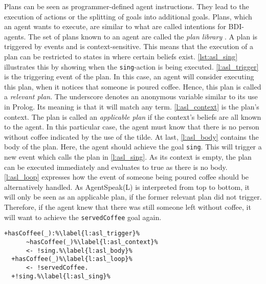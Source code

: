 Plans can be seen as programmer-defined agent instructions. They lead to the execution of actions or the splitting of goals into additional goals. Plans, which an agent wants to execute, are similar to what are called intentions for BDI-agents. The set of plans known to an agent are called the \emph{plan library} \cite{bordini_jason_2005}. A plan is triggered by events and is context-sensitive. This means that the execution of a plan can be restricted to states in where certain beliefs exist. \autoref{lst:asl_sing} illustrates this by showing when the \texttt{sing}-action is being executed. \autoref{l:asl_trigger} is the triggering event of the plan. In this case, an agent will consider executing this plan, when it notices that someone is poured coffee. Hence, this plan is called a \emph{relevant plan}. The underscore denotes an anonymous variable similar to its use in Prolog. Its meaning is that it will match any term. \autoref{l:asl_context} is the plan's context. The plan is called an \emph{applicable plan} if the context's beliefs are all known to the agent. In this particular case, the agent must know that there is no person without coffee indicated by the use of the tilde. At last, \autoref{l:asl_body} contains the body of the plan. Here, the agent should achieve the goal \texttt{sing}. This will trigger a new event which calls the plan in \autoref{l:asl_sing}. As its context is empty, the plan can be executed immediately and evaluates to true as there is no body. \autoref{l:asl_loop} expresses how the event of someone being poured coffee should be alternatively handled. As AgentSpeak(L) is interpreted from top to bottom, it will only be seen as an applicable plan, if the former relevant plan did not trigger. Therefore, if the agent knew that there was still someone left without coffee, it will want to achieve the \texttt{servedCoffee} goal again.
\begin{lstlisting}[firstnumber=4, caption={Events for handling someone being poured a coffee as well as the \texttt{sing} plan.}, label=lst:asl_sing]
  +hasCoffee(_):%\label{l:asl_trigger}%
      ~hasCoffee(_)%\label{l:asl_context}%
      <- !sing.%\label{l:asl_body}%
  +hasCoffee(_)%\label{l:asl_loop}%
      <- !servedCoffee.
  +!sing.%\label{l:asl_sing}%
\end{lstlisting}
